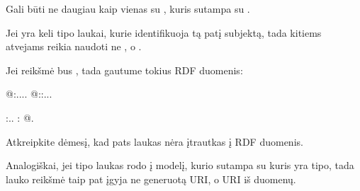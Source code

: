 \documentclass[letterpaper,10pt,lithuanian]{sphinxmanual}
\begin{document}
\sphinxAtStartPar
Gali būti ne daugiau kaip vienas {\hyperref[\detokenize{dimensijos:property.uri}]{}} su {\hyperref[\detokenize{dimensijos:property.type}]{}}
{\hyperref[\detokenize{formatas:uri}]{}}, kuris sutampa su {\hyperref[\detokenize{dimensijos:model.uri}]{}}.

\sphinxAtStartPar
Jei yra keli {\hyperref[\detokenize{formatas:uri}]{}} tipo laukai, kurie identifikuoja tą patį subjektą,
tada kitiems atvejams reikia naudoti ne {\hyperref[\detokenize{dimensijos:model.uri}]{}}, o .

\sphinxAtStartPar
Jei  reikšmė bus , tada gautume tokius
RDF duomenis:

\begin{sphinxVerbatim}[commandchars=\\\{\}]
@:....
@::..\PYGZsh{}.

:..
:
@.
\end{sphinxVerbatim}

\sphinxAtStartPar
Atkreipkite dėmesį, kad pats  laukas nėra įtrautkas į RDF duomenis.

\sphinxAtStartPar
Analogiškai, jei {\hyperref[\detokenize{formatas:ref}]{}} tipo laukas rodo į modelį, kurio {\hyperref[\detokenize{dimensijos:model.uri}]{}}
sutampa su {\hyperref[\detokenize{dimensijos:property.uri}]{}} kuris yra {\hyperref[\detokenize{formatas:ref}]{}} tipo, tada {\hyperref[\detokenize{formatas:ref}]{}}
lauko reikšmė taip pat įgyja ne generuotą URI, o URI iš duomenų.
\end{document}
